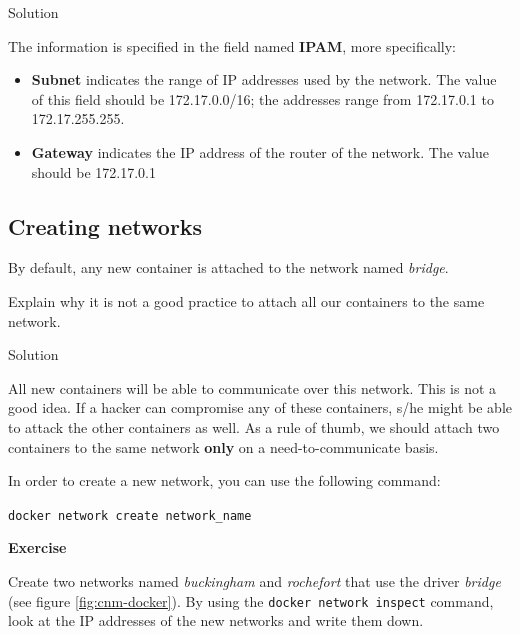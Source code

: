 \documentclass[
]{article}
\newenvironment{infobox}[1]
  {
  \begin{itemize}
  \renewcommand{\labelitemi}{
    \raisebox{-.7\height}[0pt][0pt]{
      
    }
  }
  \setlength{\fboxsep}{1em}
  \begin{whitebox}
  \item
  }
  {
  \end{whitebox}
  \end{itemize}
  }
\theoremstyle{definition}
\theoremstyle{definition}
\theoremstyle{definition}
\theoremstyle{remark}
\let\BeginKnitrBlock\begin \let\EndKnitrBlock\end
\begin{document}
Solution

\begin{infobox}{exercisebox}

The information is specified in the field named \textbf{IPAM}, more specifically:

\begin{itemize}
\item
  \textbf{Subnet} indicates the range of IP addresses used by the network.
  The value of this field should be 172.17.0.0/16;
  the addresses range from 172.17.0.1 to 172.17.255.255.
\item
  \textbf{Gateway} indicates the IP address of the router of the network.
  The value should be 172.17.0.1
\end{itemize}

\end{infobox}

\subsection{Creating networks}\label{creating-networks}

By default, any new container is attached to the network named \emph{bridge}.

\begin{infobox}{exercisebox}

\BeginKnitrBlock{exercise}
\label{exr:unnamed-chunk-31}{\label{exr:unnamed-chunk-31} }
Explain why it is not a good practice to
attach all our containers to the same network.
\EndKnitrBlock{exercise}

\end{infobox}

Solution

\begin{infobox}{exercisebox}
All new containers will be able to communicate over this network.
This is not a good idea.
If a hacker can compromise any of these containers, s/he might
be able to attack the other containers as well.
As a rule of thumb, we should attach two containers to the same network \textbf{only} on a
need-to-communicate basis.

\end{infobox}

In order to create a new network, you can use the following command:

\texttt{docker\ network\ create\ network\_name}

\begin{infobox}{exercisebox}

\textbf{Exercise}

\BeginKnitrBlock{exercise}
\label{exr:unnamed-chunk-32}{\label{exr:unnamed-chunk-32} }Create two networks named \emph{buckingham} and \emph{rochefort} that
use the driver \emph{bridge} (see figure \ref{fig:cnm-docker}).
By using the \texttt{docker\ network\ inspect} command,
look at the IP addresses of the new networks and write them down.
\EndKnitrBlock{exercise}

\end{infobox}
\end{document}

